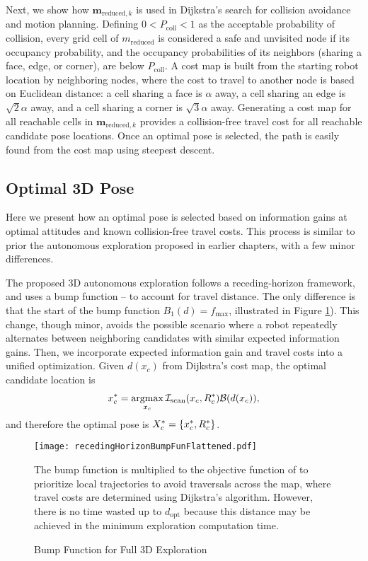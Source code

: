 Next, we show how $\mathbf{m}_{\text{reduced},k}$ is used in Dijkstra's search for collision avoidance and motion planning. Defining $0<P_\text{coll}<1$ as the acceptable probability of collision, every grid cell of $ m_\text{reduced}$ is considered a safe and unvisited node if its occupancy probability, and the occupancy probabilities of its neighbors (sharing a face, edge, or corner), are below $P_\text{coll}$. A cost map is built from the starting robot location by neighboring nodes, where the cost to travel to another node is based on Euclidean distance: a cell sharing a face is $\alpha$ away, a cell sharing an edge is $\sqrt2\alpha$ away, and a cell sharing a corner is $\sqrt3\alpha$ away. Generating a cost map for all reachable cells in $\mathbf{m}_{\text{reduced},k}$ provides a collision-free travel cost for all reachable candidate pose locations. Once an optimal pose is selected, the path is easily found from the cost map using steepest descent.


\subsection{Optimal 3D Pose}

Here we present how an optimal pose is selected based on information gains at optimal attitudes and known collision-free travel costs. This process is similar to prior the autonomous exploration proposed in earlier chapters, with a few minor differences.

The proposed 3D autonomous exploration follows a receding-horizon framework, and uses a bump function -- to account for travel distance. The only difference is that the start of the bump function $B_1(d)=f_\text{max}$, illustrated in Figure \ref{fig:recedingHorizonBumpFun}). This change, though minor, avoids the possible scenario where a robot repeatedly alternates between neighboring candidates with similar expected information gains.
Then, we incorporate expected information gain and travel costs into a unified optimization. Given $d(x_c)$ from Dijkstra's cost map, the optimal candidate location is
\begin{align}
\label{eqn:CandidateLocationOptimization}
x_c^*=\argmax_{x_c}\mathcal{I}_\text{scan}(x_c,R_c^*)\mathcal B(d(x_c)),
\end{align}
and therefore the optimal pose is $X_c^*=\left\{ x_c^*,R_c^* \right\}$.

\begin{figure}[!t]
	\centering
	\vspace*{-0.3\columnwidth}
		\centerline{
			\texttt{[image: recedingHorizonBumpFunFlattened.pdf]}
		}
	\vspace*{-0.25\columnwidth}
	\caption{Bump Function for Full 3D Exploration}
	\medskip
	\small
	The bump function is multiplied to the objective function of  to prioritize local trajectories to avoid traversals across the map, where travel costs are determined using Dijkstra's algorithm. However, there is no time wasted up to $d_\text{opt}$ because this distance may be achieved in the minimum exploration computation time.
	\label{fig:recedingHorizonBumpFun}
\end{figure}
	
